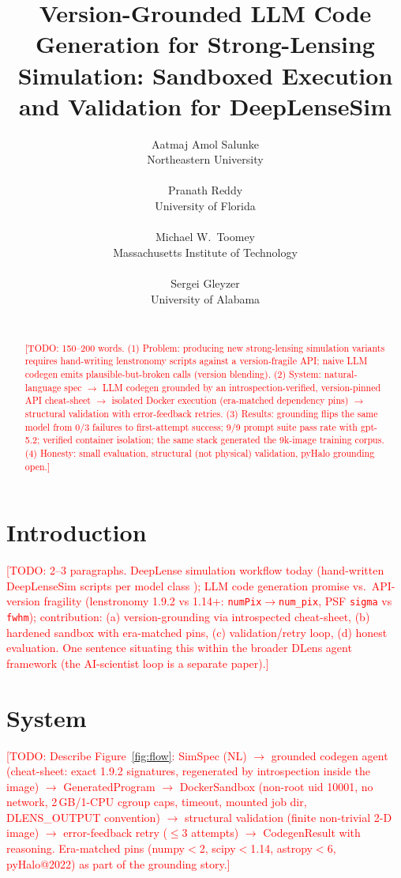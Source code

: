 \documentclass{article}
\title{Version-Grounded LLM Code Generation for Strong-Lensing Simulation:
Sandboxed Execution and Validation for DeepLenseSim}
\author{%
  Aatmaj Amol Salunke\\
  Northeastern University\\
  \texttt{\todo{email}}\\
  \And
  Pranath Reddy\\
  University of Florida\\
  \texttt{\todo{email}}\\
  \And
  Michael W.\ Toomey\\
  Massachusetts Institute of Technology\\
  \texttt{\todo{email}}\\
  \And
  Sergei Gleyzer\\
  University of Alabama\\
  \texttt{\todo{email}}\\
}
\newcommand{\todo}[1]{\textcolor{red}{[TODO: #1]}}
\begin{document}
\maketitle

\begin{abstract}
\todo{150--200 words. (1) Problem: producing new strong-lensing simulation
variants requires hand-writing lenstronomy scripts against a version-fragile API;
naive LLM codegen emits plausible-but-broken calls (version blending). (2) System:
natural-language spec $\to$ LLM codegen grounded by an introspection-verified,
version-pinned API cheat-sheet $\to$ isolated Docker execution (era-matched
dependency pins) $\to$ structural validation with error-feedback retries.
(3) Results: grounding flips the same model from 0/3 failures to first-attempt
success; 9/9 prompt suite pass rate with gpt-5.2; verified container isolation;
the same stack generated the 9k-image training corpus. (4) Honesty: small
evaluation, structural (not physical) validation, pyHalo grounding open.}
\end{abstract}

\section{Introduction}
\todo{2--3 paragraphs. DeepLense simulation workflow today (hand-written
DeepLenseSim scripts per model class \citep{alexander2020deep,toomey2022deep});
LLM code generation promise vs.\ API-version fragility (lenstronomy 1.9.2 vs
1.14+: \texttt{numPix}$\to$\texttt{num\_pix}, PSF \texttt{sigma} vs
\texttt{fwhm}); contribution: (a) version-grounding via introspected cheat-sheet,
(b) hardened sandbox with era-matched pins, (c) validation/retry loop, (d) honest
evaluation. One sentence situating this within the broader DLens agent framework
(the AI-scientist loop is a separate paper).}

\section{System}
\label{sec:system}
\todo{Describe Figure~\ref{fig:flow}: SimSpec (NL) $\to$ grounded codegen agent
(cheat-sheet: exact 1.9.2 signatures, regenerated by introspection inside the
image) $\to$ GeneratedProgram $\to$ DockerSandbox (non-root uid 10001, no network,
2\,GB/1-CPU cgroup caps, timeout, mounted job dir, DLENS\_OUTPUT convention)
$\to$ structural validation (finite non-trivial 2-D image) $\to$ error-feedback
retry ($\le$3 attempts) $\to$ CodegenResult with reasoning. Era-matched pins
(numpy$<$2, scipy$<$1.14, astropy$<$6, pyHalo@2022) as part of the grounding
story.}
\end{document}
